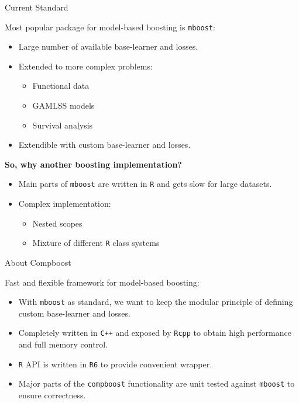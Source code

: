 \documentclass[10pt]{beamer}\usepackage[]{graphicx}\usepackage[]{color}
\begin{document}
\begin{frame}{Current Standard}

Most popular package for model-based boosting is \texttt{mboost}:

\begin{itemize}

  \item
    Large number of available base-learner and losses.

  \item
    Extended to more complex problems:
    \begin{itemize}
      \item Functional data
      \item GAMLSS models
      \item Survival analysis
    \end{itemize}
  \item
    Extendible with custom base-learner and losses.

\end{itemize}

\textbf{So, why another boosting implementation?}

\begin{itemize}

  \item
    Main parts of \texttt{mboost} are written in \texttt{R} and gets slow for large datasets.

  \item
    Complex implementation:
    \begin{itemize}
      \item Nested scopes
      \item Mixture of different \texttt{R} class systems
    \end{itemize}
\end{itemize}

\end{frame}


\begin{frame}{About Compboost}


Fast and flexible framework for model-based boosting:

\begin{itemize}

  \item
    With \texttt{mboost} as standard, we want to keep the modular principle of defining custom base-learner and losses.

  \item
    Completely written in \texttt{C++} and exposed by \texttt{Rcpp} to obtain high performance and full memory control.

  \item
    \texttt{R} API is written in \texttt{R6} to provide convenient wrapper.

  \item
    Major parts of the \texttt{compboost} functionality are unit tested against \texttt{mboost} to ensure correctness.

\end{itemize}

\end{frame}
\end{document}
